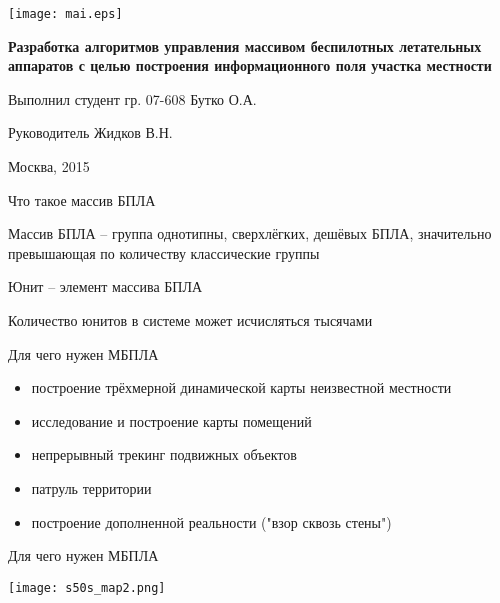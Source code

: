 



\begin{cslide}
    \texttt{[image: mai.eps]}

    \large\textbf{ Разработка алгоритмов управления
    массивом беспилотных летательных аппаратов
    с целью построения информационного поля
    участка местности}

    \vfill

    \begin{flushright}
    \small Выполнил студент гр. 07-608 Бутко О.А.

    \small Руководитель Жидков В.Н.
    \end{flushright}

    \vfill

    \small Москва, 2015
\end{cslide}

\begin{tslide}{Что такое массив БПЛА}

    Массив БПЛА -- группа однотипны, сверхлёгких, дешёвых БПЛА,
    значительно превышающая по количеству классические группы

    Юнит -- элемент массива БПЛА

    Количество юнитов в системе может исчисляться тысячами
\end{tslide}

\begin{tslide}{Для чего нужен МБПЛА}
\begin{itemize}
    \item построение трёхмерной динамической \newline
        карты неизвестной местности
    \item исследование и построение карты помещений
    \item непрерывный трекинг подвижных объектов
    \item патруль территории
    \item построение дополненной реальности \newline ("взор сквозь стены")
\end{itemize}
\end{tslide}

\begin{tslide}{Для чего нужен МБПЛА}

    \texttt{[image: s50s\_map2.png]}

\end{tslide}

